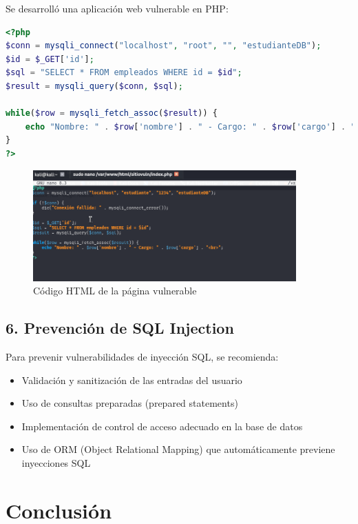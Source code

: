 \documentclass[12pt,a4paper]{article}
\begin{document}
Se desarrolló una aplicación web vulnerable en PHP:

\begin{lstlisting}[language=php, caption=Aplicación web vulnerable]
<?php
$conn = mysqli_connect("localhost", "root", "", "estudianteDB");
$id = $_GET['id'];
$sql = "SELECT * FROM empleados WHERE id = $id";
$result = mysqli_query($conn, $sql);

while($row = mysqli_fetch_assoc($result)) {
    echo "Nombre: " . $row['nombre'] . " - Cargo: " . $row['cargo'] . "<br>";
}
?>
\end{lstlisting}

\begin{figure}[H]
    \centering
    \includegraphics[width=0.9\textwidth]{html.png}
    \caption{Código HTML de la página vulnerable}
    \label{fig:html}
\end{figure}

\subsection{6. Prevención de SQL Injection}
Para prevenir vulnerabilidades de inyección SQL, se recomienda:

\begin{itemize}
    \item Validación y sanitización de las entradas del usuario
    \item Uso de consultas preparadas (prepared statements)
    \item Implementación de control de acceso adecuado en la base de datos
    \item Uso de ORM (Object Relational Mapping) que automáticamente previene inyecciones SQL
\end{itemize}

\section{Conclusión}
\end{document}
